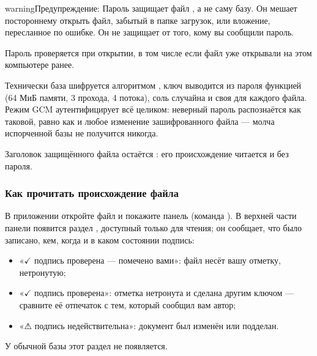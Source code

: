 \documentclass[letterpaper,10pt,russian]{sphinxmanual}
\begin{document}
\begin{sphinxadmonition}{warning}{Предупреждение:}
\sphinxAtStartPar
Пароль защищает файл , а не саму базу. Он мешает постороннему открыть файл, забытый в папке загрузок, или вложение, пересланное по ошибке. Он не защищает от того, кому вы сообщили пароль.
\end{sphinxadmonition}

\sphinxAtStartPar
Пароль проверяется при  открытии, в том числе если файл уже открывали на этом компьютере ранее.

\sphinxAtStartPar
Технически база шифруется алгоритмом , ключ выводится из пароля функцией  (64 МиБ памяти, 3 прохода, 4 потока), соль случайна и своя для каждого файла. Режим GCM аутентифицирует всё целиком: неверный пароль распознаётся как таковой, равно как и любое изменение зашифрованного файла — молча испорченной базы не получится никогда.

\sphinxAtStartPar
Заголовок защищённого файла остаётся : его происхождение читается и без пароля.


\subsubsection{Как прочитать происхождение файла}
\label{\detokenize{manuel:lire-l-origine-d-un-fichier}}
\sphinxAtStartPar
В приложении откройте файл и покажите панель  (команда ). В верхней части панели появится раздел , доступный только для чтения; он сообщает, что было записано, кем, когда и в каком состоянии подпись:
\begin{itemize}
\item {} 
\sphinxAtStartPar
«\(\checkmark\) подпись проверена — помечено вами»: файл несёт вашу отметку, нетронутую;

\item {} 
\sphinxAtStartPar
«\(\checkmark\) подпись проверена»: отметка нетронута и сделана другим ключом — сравните её отпечаток с тем, который сообщил вам автор;

\item {} 
\sphinxAtStartPar
«⚠ подпись недействительна»: документ был изменён или подделан.

\end{itemize}

\sphinxAtStartPar
У обычной базы этот раздел не появляется.
\end{document}
